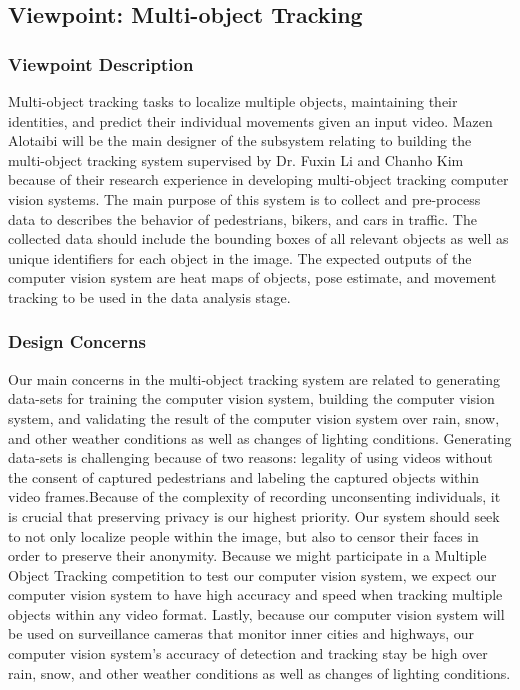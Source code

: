 \subsection{Viewpoint: Multi-object Tracking}

\subsubsection{Viewpoint Description}

Multi-object tracking tasks to localize multiple objects, maintaining their identities, and predict their individual movements given an input video. Mazen Alotaibi will be the main designer of the subsystem relating to building the multi-object tracking system supervised by Dr. Fuxin Li and Chanho Kim because of their research experience in developing multi-object tracking computer vision systems. The main purpose of this system is to collect and pre-process data to describes the behavior of pedestrians, bikers, and cars in traffic. The collected data should include the bounding boxes of all relevant objects as well as unique identifiers for each object in the image. The expected outputs of the computer vision system are heat maps of objects, pose estimate, and movement tracking to be used in the data analysis stage.

\subsubsection{Design Concerns}

Our main concerns in the multi-object tracking system are related to generating data-sets for training the computer vision system, building the computer vision system, and validating the result of the computer vision system over rain, snow, and other weather conditions as well as changes of lighting conditions. Generating data-sets is challenging because of two reasons: legality of using videos without the consent of captured pedestrians and labeling the captured objects within video frames.Because of the complexity of recording unconsenting individuals, it is crucial that preserving privacy is our highest priority. Our system should seek to not only localize people within the image, but also to censor their faces in order to preserve their anonymity. Because we might participate in a Multiple Object Tracking competition to test our computer vision system, we expect our computer vision system to have high accuracy and speed when tracking multiple objects within any video format. Lastly, because our computer vision system will be used on surveillance cameras that monitor inner cities and highways, our computer vision system's accuracy of detection and tracking stay be high over rain, snow, and other weather conditions as well as changes of lighting conditions. 

